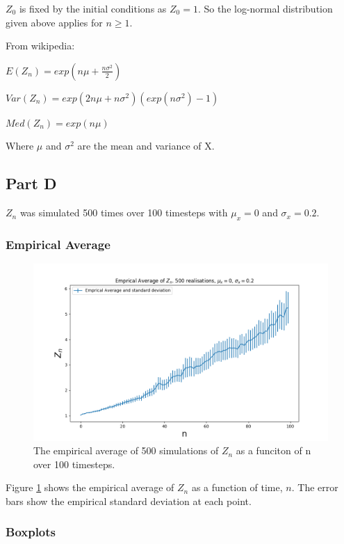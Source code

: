 \documentclass{article}
\begin{document}
$Z_0$ is fixed by the initial conditions as $Z_0=1$. So the log-normal distribution given above applies for $n \geq 1$.

\bigskip

From wikipedia: 

$E(Z_n) = exp(n\mu + \frac{n\sigma^2}{2})$

$Var(Z_n) = exp(2n \mu + n\sigma^2)(exp(n\sigma^2)-1)$

$Med(Z_n) = exp(n\mu)$

Where $\mu$ and $\sigma^2$ are the mean and variance of X.

\subsection{Part D}
$Z_n$ was simulated 500 times over 100 timesteps with $\mu_x=0$ and $\sigma_x=0.2$.

\subsubsection{Empirical Average}

\begin{figure}[H]
\includegraphics[scale=0.5]{empirical_average_a.png} 
\caption{The empirical average of 500 simulations of $Z_n$ as a funciton of n over 100 timesteps. }
\label{fig:empirical_avg}
\end{figure}


Figure \ref{fig:empirical_avg} shows the empirical average of $Z_n$ as a function of time, $n$. The error bars show the empirical standard deviation at each point. 

\subsubsection{Boxplots}
\end{document}
